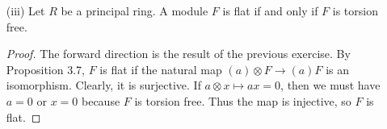 \documentclass[10pt]{article}
\newcommand{\p}{\mathfrak{p}}
\begin{document}
\begin{enumerate}
\begin{enumerate}
\begin{proof}
Next, suppose $M_\p$ is flat over $R_\p$ for all $\p$, and that $\begin{tikzcd} 0 \arrow[r] & X \arrow[r] & Y \end{tikzcd}$ is exact (over $R$).  Then $\begin{tikzcd} 0 \arrow[r] & M_\p \otimes_{R_\p} X_\p \arrow[r] & M_\p \otimes_{R_\p} Y_\p \end{tikzcd}$ and hence $\begin{tikzcd} 0 \arrow[r] & (M \otimes_R X)_\p \arrow[r] & (M \otimes_R Y)_\p \end{tikzcd}$ are exact for all $\p$.  By the previous paragraph, $\begin{tikzcd} 0 \arrow[r] & M \otimes_R X \arrow[r] & M \otimes_R Y \end{tikzcd}$ must be exact, so $M$ is flat.
\end{proof}

\item[(iii)] Let $R$ be a principal ring.  A module $F$ is flat if and only if $F$ is torsion free.
\begin{proof}
The forward direction is the result of the previous exercise.  By Proposition 3.7, $F$ is flat if the natural map $(a) \otimes F \rightarrow (a)F$ is an isomorphism.  Clearly, it is surjective.  If $a \otimes x \mapsto ax = 0$, then we must have $a = 0$ or $x = 0$ because $F$ is torsion free.  Thus the map is injective, so $F$ is flat.
\end{proof}
\end{enumerate}

\end{enumerate}
\end{document}
